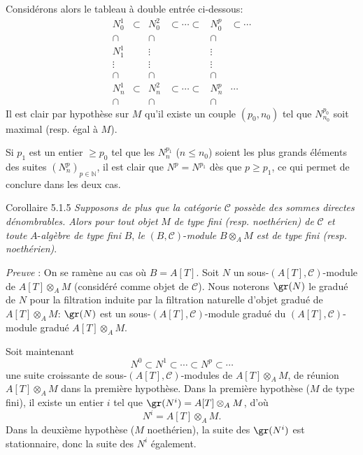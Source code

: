 Considérons alors le tableau à double entrée ci-dessous:
\[
\begin{array}{cccccc}
N_0^1&\subset&N_0^2&\subset\cdots\subset&N_0^p&\subset\cdots\\
\cap&&\cap&&\cap\\
N_1^1&&\vdots&&\vdots\\
\vdots&&\vdots&&\vdots\\
\cap&&\cap&&\cap\\
N_n^1&\subset&N_n^2&\subset\cdots\subset&N_n^p&\cdots\\
\cap&&\cap&&\cap
\end{array}
\]
Il est clair par hypothèse sur \(M\) qu'il existe un couple \((p_0,n_0)\) tel que \(N^{p_0}_{n_0}\) soit maximal (resp. égal à \(M\)).

Si \(p_1\) est un entier \(\ge p_0\) tel que les \(N_n^{p_1}\) (\(n\le n_0\)) soient les plus grands éléments des suites \((N_n^p)_{p\in\mathbb{N}}\), il est clair que \(N^p=N^{p_1}\) dès que \(p\ge p_1\), ce qui permet de conclure dans les deux cas.

\begin{statement}{Corollaire 5.1.5}
\emph{Supposons de plus que la catégorie} \(\mathcal{C}\) \emph{possède des sommes directes dénombrables. Alors pour tout objet} \(M\) \emph{de type fini (resp. noethérien) de} \(\mathcal{C}\) \emph{et toute} \(A\)-\emph{algèbre de type fini} \(B\), \emph{le} \((B,\mathcal{C})\)-\emph{module} \(B\otimes_A M\) \emph{est de type fini (resp. noethérien)}.
\end{statement}

\emph{Preuve} : On se ramène au cas où \(B=A[T]\). Soit \(N\) un sous-\((A[T],\mathcal{C})\)-module de \(A[T]\otimes_A M\) (considéré comme objet de \(\mathcal{C}\)). Nous noterons \(\gr(N)\) le gradué de \(N\) pour la filtration induite par la filtration naturelle d'objet gradué de \(A[T]\otimes_A M\): \(\gr(N)\) est un sous-\((A[T],\mathcal{C})\)-module gradué du \((A[T],\mathcal{C})\)-module gradué \(A[T]\otimes_A M\).

Soit
maintenant
\[
N^0\subset N^1\subset\cdots\subset N^p\subset\cdots
\]
une suite croissante de sous-\((A[T],\mathcal{C})\)-modules de \(A[T]\otimes_A M\), de réunion \(A[T]\otimes_A M\) dans la première hypothèse. Dans la première hypothèse (\(M\) de type fini), il existe un entier \(i\) tel que \(\gr(N^i)=A[T]\otimes_A M\), d'où
\[
N^i=A[T]\otimes_A M.
\]
Dans la deuxième hypothèse (\(M\) noethérien), la suite des \(\gr(N^i)\) est stationnaire, donc la suite des \(N^i\) également.

